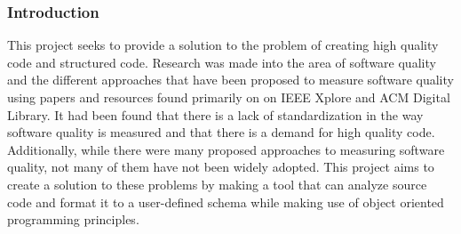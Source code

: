 \subsubsection{Introduction} %
This project seeks to provide a solution to the problem of creating high quality code and structured code. Research was made into the area of software quality and the different approaches that have been proposed to measure software quality using papers and resources found primarily on on IEEE Xplore and ACM Digital Library.
It had been found that there is a lack of standardization in the way software quality is measured and that there is a demand for high quality code. Additionally, while there were many proposed approaches to measuring software quality, not many of them have not been widely adopted.
This project aims to create a solution to these problems by making a tool that can analyze source code and format it to a user-defined schema while making use of object oriented programming principles.
